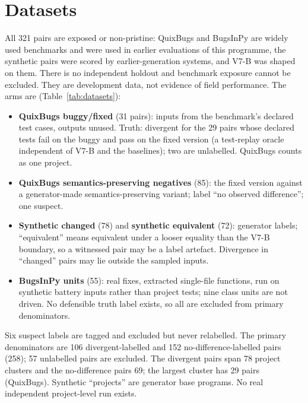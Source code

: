 \section{Datasets}\label{sec:datasets}
All 321 pairs are exposed or non-pristine: QuixBugs and BugsInPy are widely used benchmarks and were used in earlier evaluations of this programme, the synthetic pairs were scored by earlier-generation systems, and V7-B was shaped on them. There is no independent holdout and benchmark exposure cannot be excluded. They are development data, not evidence of field performance. The arms are (Table~\ref{tab:datasets}):
\begin{itemize}
\item \textbf{QuixBugs buggy/fixed} (31 pairs): inputs from the benchmark's declared test cases, outputs unused. Truth: divergent for the 29 pairs whose declared tests fail on the buggy and pass on the fixed version (a test-replay oracle independent of V7-B and the baselines); two are unlabelled. QuixBugs counts as one project.
\item \textbf{QuixBugs semantics-preserving negatives} (85): the fixed version against a generator-made semantics-preserving variant; label ``no observed difference''; one suspect.
\item \textbf{Synthetic changed} (78) and \textbf{synthetic equivalent} (72): generator labels; ``equivalent'' means equivalent under a looser equality than the V7-B boundary, so a witnessed pair may be a label artefact. Divergence in ``changed'' pairs may lie outside the sampled inputs.
\item \textbf{BugsInPy units} (55): real fixes, extracted single-file functions, run on synthetic battery inputs rather than project tests; nine class units are not driven. No defensible truth label exists, so all are excluded from primary denominators.
\end{itemize}
Six suspect labels are tagged and excluded but never relabelled. The primary denominators are 106 divergent-labelled and 152 no-difference-labelled pairs (258); 57 unlabelled pairs are excluded. The divergent pairs span 78 project clusters and the no-difference pairs 69; the largest cluster has 29 pairs (QuixBugs). Synthetic ``projects'' are generator base programs. No real independent project-level run exists.

